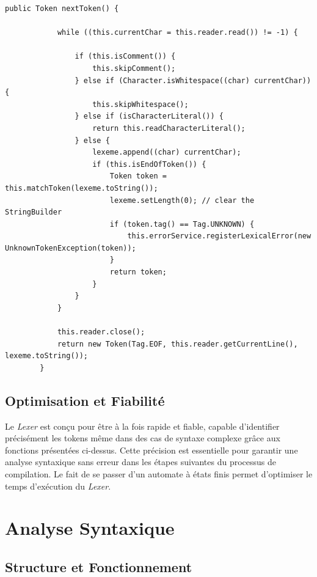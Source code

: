 \documentclass[french,a4paper]{article}
\begin{document}
    \begin{lstlisting}[label={lst:lstlisting12}]
        public Token nextToken() {

            while ((this.currentChar = this.reader.read()) != -1) {

                if (this.isComment()) {
                    this.skipComment();
                } else if (Character.isWhitespace((char) currentChar)) {
                    this.skipWhitespace();
                } else if (isCharacterLiteral()) {
                    return this.readCharacterLiteral();
                } else {
                    lexeme.append((char) currentChar);
                    if (this.isEndOfToken()) {
                        Token token = this.matchToken(lexeme.toString());
                        lexeme.setLength(0); // clear the StringBuilder
                        if (token.tag() == Tag.UNKNOWN) {
                            this.errorService.registerLexicalError(new UnknownTokenException(token));
                        }
                        return token;
                    }
                }
            }

            this.reader.close();
            return new Token(Tag.EOF, this.reader.getCurrentLine(), lexeme.toString());
        }
    \end{lstlisting}

    \subsection{Optimisation et Fiabilité}\label{subsec:optimisation-et-fiabilite}

    Le \textit{Lexer} est conçu pour être à la fois rapide et fiable, capable d'identifier précisément les tokens même dans des cas de syntaxe complexe grâce aux fonctions présentées ci-dessus.
    Cette précision est essentielle pour garantir une analyse syntaxique sans erreur dans les étapes suivantes du processus de compilation.
    Le fait de se passer d'un automate à états finis permet d'optimiser le temps d'exécution du \textit{Lexer}.

    \section{Analyse Syntaxique}\label{sec:analyse-syntaxique}

    \subsection{Structure et Fonctionnement}\label{subsec:structure-et-fonctionnement}
\end{document}
